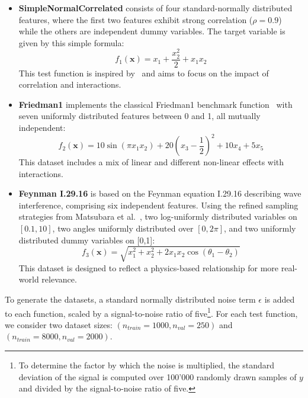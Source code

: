 \documentclass[runningheads]{llncs}
\begin{document}
\begin{itemize}[label=--]
    \item \textbf{SimpleNormalCorrelated} consists of four
          standard-normally distributed features, where the first two
          features exhibit strong correlation ($\rho = 0.9$) while the others are
          independent dummy variables. The target variable is given by this simple
          formula:
          \begin{equation}
              f_1(\boldsymbol{x}) = x_1 + \frac{x_2^2}{2} + x_1 x_2
          \end{equation}
          This test function is inspired by~\cite{liu_model_2018} and aims
          to focus on the impact of correlation and interactions.
    \item \textbf{Friedman1} implements the classical Friedman1 benchmark
          function~\cite{breiman_bagging_1996,friedman_multivariate_1991}
          with seven uniformly distributed features between 0 and 1, all mutually
          independent:
          \begin{equation}
              f_2(\boldsymbol{x}) = 10 \sin(\pi x_1 x_2) + 20{(x_3 - \frac{1}{2})}^2 + 10 x_4 + 5 x_5
          \end{equation}
          This dataset includes a mix of linear and different non-linear effects with
          interactions.
    \item \textbf{Feynman I.29.16} is based on the Feynman equation I.29.16
          describing wave interference, comprising six independent features. Using
          the refined sampling strategies from Matsubara et al.~\cite{matsubara_rethinking_2024},
          two log-uniformly distributed variables on $[0.1, 10]$, two angles uniformly
          distributed over $[0, 2\pi]$, and two uniformly distributed dummy variables on [0,1]:
          \begin{equation}
              f_3(\boldsymbol{x}) = \sqrt{x_1^2 + x_2^2 + 2 x_1 x_2 \cos(\theta_1 - \theta_2)}
          \end{equation}
          This dataset is designed to reflect a physics-based relationship for more real-world relevance.

\end{itemize}

\noindent To generate the datasets, a standard normally distributed noise term $\epsilon$ is added to each function,
scaled by a signal-to-noise ratio of five\footnote{To determine the factor by which the noise is multiplied,
    the standard deviation of the signal is computed over 100'000 randomly drawn samples of $y$ and divided by
    the signal-to-noise ratio of five.}. For each test function, we consider two dataset sizes:
$(n_{train}=1000, n_{val}=250)$ and $(n_{train}=8000, n_{val}=2000)$.
\end{document}
